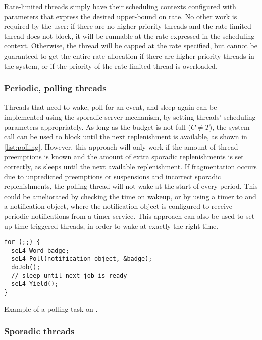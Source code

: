 Rate-limited threads simply have their scheduling contexts configured with
parameters that express the desired upper-bound on rate.  No other work is
required by the user: if there are no higher-priority threads and the
rate-limited thread does not block, it will be runnable at the rate expressed
in the scheduling context.  Otherwise, the thread will be capped at the rate
specified, but cannot be guaranteed to get the entire rate allocation if there
are higher-priority threads in the system, or if the priority of the
rate-limited thread is overloaded.

\subsubsection{Periodic, polling threads}

Threads that need to wake, poll for an event, and sleep again can be
implemented using the sporadic server mechanism, by  
setting threads' scheduling parameters appropriately. As long as the budget is
not full ($C\neq T$), the \yield system call can be used to block until the next replenishment
is available, as shown in \cref{list:polling}. However, this approach will only work if the amount of thread preemptions 
is known and the amount of extra sporadic replenishments is set correctly, as \yield sleeps until
the next available replenishment. If fragmentation occurs due to unpredicted preemptions or suspensions and incorrect sporadic
replenishments, the polling thread will not wake at the start of every period. This could be
ameliorated by checking the time on wakeup, or by using a timer to and a notification object,
where the notification object is configured to receive periodic notifications from a timer service.
This approach can also be used to set up time-triggered threads, 
in order to wake at exactly the right time.

\begin{listing}
  \begin{verbatim}
for (;;) {
  seL4_Word badge;
  seL4_Poll(notification_object, &badge);
  doJob();
  // sleep until next job is ready
  seL4_Yield();
}
  \end{verbatim}
  \caption{Example of a polling task on \selfour.}
  \label{list:polling}
\end{listing}

\subsubsection{Sporadic threads}

